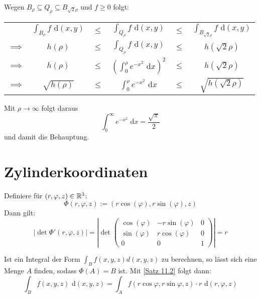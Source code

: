 \documentclass[a4paper,twoside,DIV15,BCOR12mm,chapterprefix=true,headings=onelinechapter]{scrbook}
\begin{document}
\begin{beispiel}
\begin{enumerate}
Wegen $ B_\rho \subseteq Q_\rho \subseteq B_{\sqrt{2} \rho} $ und $f \ge 0$ folgt:
\begin{center}
\begin{tabular}{cccccc}
&$\int_{B_\rho} f \text{ d}(x,y)$ &$\le$ &$\int_{Q_\rho} f \text{ d}(x,y)$ &$\le$ &$\int_{B_{\sqrt{2} \rho}} f \text{ d}(x,y)$\\
$\implies$ &$h(\rho)$ &$\le$ &$\int_{Q_\rho} f \text{ d}(x,y)$	&$\le$ &$h(\sqrt{2} \rho)$ \\
$\implies$ &$h(\rho)$ &$\le$ &$\left( \int_0^\rho e^{-x^2} \text{ d}x \right)^2$ &$\le$ &$h(\sqrt{2} \rho)$ \\
$\implies$ &$\sqrt{h(\rho)}$ &$\le$ &$\int_0^\rho e^{-x^2} \text{ d}x$ &$\le$ &$\sqrt{h(\sqrt{2} \rho)}$\\
\end{tabular}
\end{center}
Mit $\rho \to \infty$ folgt daraus 
\[\int_0^\infty e^{-x^2} \text{ d}x = \frac{\sqrt{\pi}}{2}\]
und damit die Behauptung.
\end{enumerate}
\end{beispiel}

\section{Zylinderkoordinaten}
Definiere für $(r,\varphi,z)\in\mathbb{R}^3$:
\[\Phi(r,\varphi,z):=(r\cos(\varphi),r\sin(\varphi),z)\]
Dann gilt:
\[|\det\Phi'(r,\varphi,z)|=|\det
\begin{pmatrix}
\cos(\varphi)&-r\sin(\varphi)&0\\
\sin(\varphi)&r\cos(\varphi)&0\\
0&0&1\end{pmatrix}|=r
\]

\begin{bemerkung}
Ist ein Integral der Form $\int_B f(x,y,z) d(x,y,z)$ zu berechnen, so lässt sich eine Menge $A$ finden, sodass $\Phi(A) = B$ ist.
Mit \ref{Satz 11.2} folgt dann:
\[\int_B f(x,y,z) \text{ d}(x,y,z) = \int_A f(r \cos \varphi, r \sin \varphi, z) \cdot r \text{ d}(r,\varphi,z)\]
\end{bemerkung}
\end{document}
